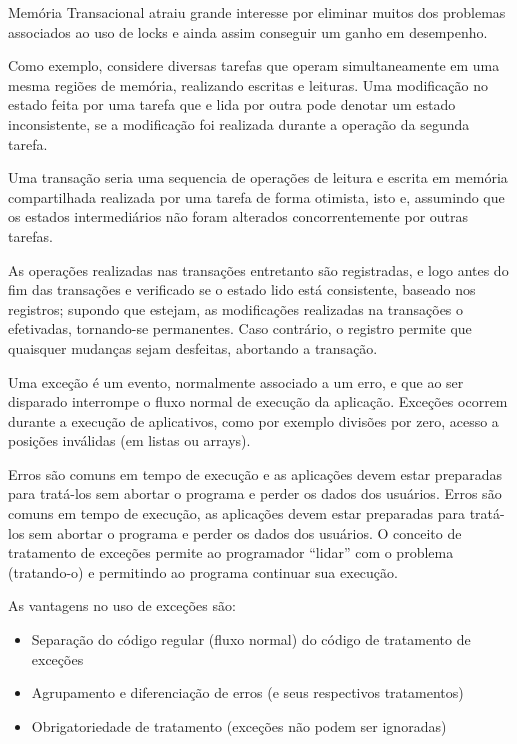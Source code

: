 Memória Transacional atraiu grande interesse por eliminar muitos dos 
problemas associados ao uso de locks e ainda assim conseguir um ganho em desempenho.


Como exemplo, considere diversas tarefas que operam simultaneamente em uma mesma regiões 
de memória, realizando escritas e leituras. Uma modificação no estado feita por uma tarefa 
que e lida por outra pode denotar um estado inconsistente, se a modificação foi realizada 
durante a operação da segunda tarefa.

Uma transação seria uma sequencia de operações de leitura e escrita em memória compartilhada 
realizada por uma tarefa de forma otimista, isto e, assumindo que os estados intermediários 
não foram alterados
 concorrentemente por outras tarefas.


As operações realizadas nas transações entretanto são registradas, e logo antes do fim das 
transações e verificado se o estado lido está consistente, baseado nos registros; supondo 
que estejam, as modificações realizadas na transações o efetivadas, tornando-se permanentes. 
Caso contrário, o registro permite que quaisquer mudanças sejam desfeitas, abortando a transação.



Uma exceção é um evento, normalmente associado a um erro, e que ao ser disparado interrompe o 
fluxo normal de execução da aplicação. Exceções ocorrem durante a execução de aplicativos, como 
por exemplo divisões por zero, acesso a posições inválidas (em listas ou arrays).


Erros são comuns em tempo de execução e as aplicações devem estar preparadas para tratá-los 
sem abortar o programa e perder os dados dos usuários. Erros são comuns em tempo de execução, 
as aplicações devem estar preparadas para tratá-los sem abortar o programa e perder os dados 
dos usuários. O conceito de tratamento de exceções permite ao programador ``lidar'' com o 
problema (tratando-o) e permitindo ao programa continuar sua execução.

As vantagens no uso de exceções são: 

\begin{itemize}
\item Separação do código regular (fluxo normal) do código de tratamento de exceções
\item Agrupamento e diferenciação de erros (e seus respectivos tratamentos)
\item Obrigatoriedade de tratamento (exceções não podem ser ignoradas)
\end{itemize}


